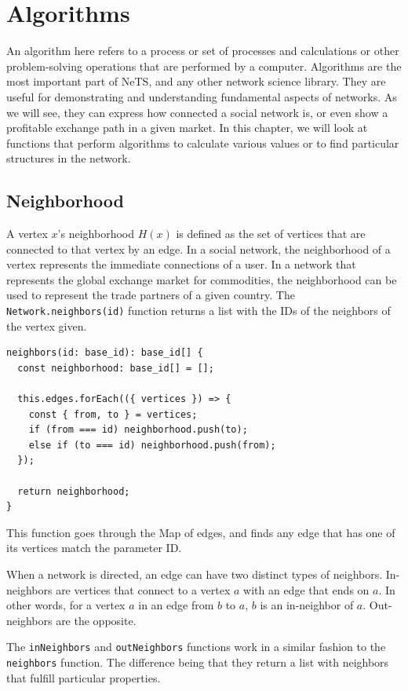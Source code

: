 \chapter{Algorithms}

An algorithm here refers to a process or set of processes and calculations
or other problem-solving operations that are performed by a computer.
Algorithms are the most important part of NeTS,
and any other network science library.
They are useful for demonstrating and understanding
fundamental aspects of networks.
As we will see, they can express how connected
a social network is, or even show a profitable exchange path
in a given market.
In this chapter, we will look at functions that
perform algorithms to calculate various values
or to find particular structures in the network.

\section{Neighborhood}
A vertex $x$'s neighborhood $H(x)$ is defined as the set of vertices that are connected to that vertex
by an edge.
In a social network, the neighborhood of a vertex represents
the immediate connections of a user.
In a network that represents the global exchange market for
commodities, the neighborhood can be used to represent
the trade partners of a given country.
The \texttt{Network.neighbors(id)}
function returns a list with the IDs of the neighbors of the vertex given.

\begin{verbatim}
neighbors(id: base_id): base_id[] {
  const neighborhood: base_id[] = [];

  this.edges.forEach(({ vertices }) => {
    const { from, to } = vertices;
    if (from === id) neighborhood.push(to);
    else if (to === id) neighborhood.push(from);
  });

  return neighborhood;
}
\end{verbatim}

This function goes through the Map of edges,
and finds any edge that has one of its vertices match the parameter ID.

When a network is directed, an edge can have two distinct types of neighbors.
In-neighbors are vertices that connect to a vertex $a$ with an edge that ends on $a$.
In other words, for a vertex $a$ in an edge from $b$ to $a$, $b$ is an in-neighbor of $a$.
Out-neighbors are the opposite.

The \texttt{inNeighbors} and \texttt{outNeighbors} functions
work in a similar fashion to the \texttt{neighbors} function.
The difference being that they return a list with neighbors that fulfill
particular properties.

